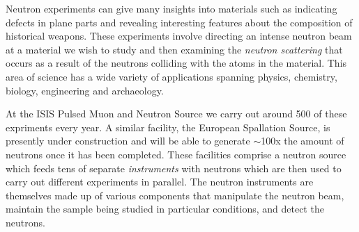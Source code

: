 Neutron experiments can give many insights into materials such as indicating defects in plane parts and revealing interesting features about the composition of historical weapons. These experiments involve directing an intense neutron beam at a material we wish to study and then examining the \textit{neutron scattering} that occurs as a result of the neutrons colliding with the atoms in the material. This area of science has a wide variety of applications spanning physics, chemistry, biology, engineering and archaeology.

At the ISIS Pulsed Muon and Neutron Source we carry out around 500 of these expriments every year. A similar facility, the European Spallation Source, is presently under construction and will be able to generate $\sim$100x the amount of neutrons once it has been completed. These facilities comprise a neutron source which feeds tens of separate \textit{instruments} with neutrons which are then used to carry out different experiments in parallel. The neutron instruments are themselves made up of various components that manipulate the neutron beam, maintain the sample being studied in particular conditions, and detect the neutrons. 

